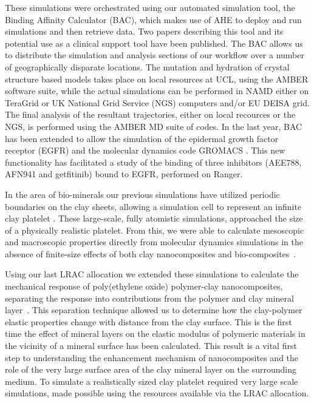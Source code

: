 These simulations were orchestrated using our automated simulation tool, the Binding Affinity Calculator (BAC), which makes use of AHE \cite{coveney2007,zasada2009} to deploy and run simulations and then retrieve data. Two papers describing this tool and its potential use as a clinical support tool have been published\cite{Sadiq2008, Sadiq2008a}. The BAC allows us to distribute the simulation and analysis sections of our workflow over a number of geographically disparate locations. The mutation and hydration of crystal structure based models takes place on local resources at UCL, using the AMBER software suite, while the actual simulations can be performed in NAMD either on TeraGrid or UK National Grid Service (NGS) computers and/or EU DEISA grid. The final analysis of the resultant trajectories, either on local recources or the NGS, is performed using the AMBER MD suite of codes. In the last year, BAC has been extended to allow the simulation of the epidermal growth factor receptor (EGFR) and the molecular dynamics code GROMACS \cite{Hess2008}. This new functionality has facilitated a study of the binding of three inhibitors (AEE788, AFN941 and getfitinib) bound to EGFR, performed on Ranger.

In the area of bio-minerals our previous simulations have utilized periodic boundaries on the clay sheets, allowing a simulation cell to represent an infinite clay platelet \cite{JPCC_2007,Thyveetil,Thyveetil_JACS, Soft_Matter1}. These large-scale, fully atomistic simulations, approached the size of a physically realistic platelet. From this, we were able to calculate mesoscopic and macroscopic properties directly from  molecular dynamics simulations in the absence of finite-size effects of both clay nanocomposites\cite{JPCC_2007,Thyveetil, Soft_Matter1} and bio-composites~\cite{Thyveetil_JACS}.

Using our last LRAC allocation we extended these simulations to calculate the mechanical response of poly(ethylene oxide) polymer-clay nanocomposites, separating the response into contributions from the polymer and clay 
mineral layer~\cite{Soft_Matter1}. This separation technique allowed us to determine how the clay-polymer elastic properties change with distance from the clay surface. This is the first time the effect of mineral layers on the elastic modulus of polymeric materials in the vicinity of a mineral surface has been calculated. This result is a vital first step to 
understanding the enhancement mechanism of nanocomposites and the role of the very large surface area of the clay mineral layer on the surrounding medium. To simulate a realistically sized clay platelet required very large scale simulations, made possible using the resources available via the LRAC allocation. 

